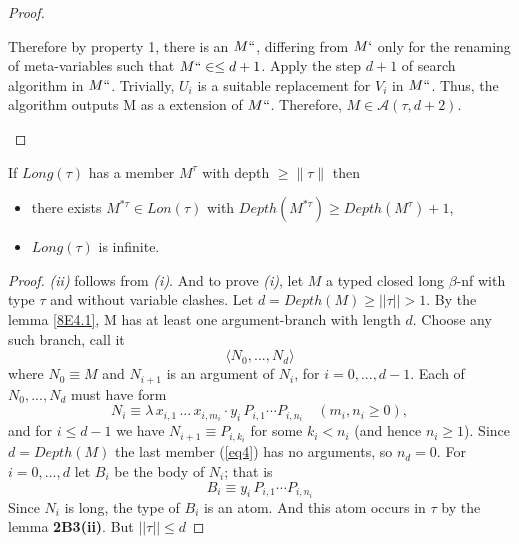 \documentclass[a4paper,10pt]{article}
\begin{document}
\begin{lem}
\begin{proof}
\begin{itemize}
                 Therefore by property 1, there is an $M``$, differing
                 from $M`$ only for the renaming of meta-variables
                 such that $M`` \in \leq d+1$.  Apply the step $d+1$
                 of search algorithm in $M``$. Trivially, $U_i$ is a
                 suitable replacement for $V_i$ in $M``$. Thus, the
                 algorithm outputs M as a extension of
                 $M``$. Therefore, $M \in \mathcal{A}(\tau,d+2)$.
        \end{itemize}
 
\end{proof}
\end{lem}

\begin{lem}\label{8F2} If $Long(\tau)$ has a member $M^{\tau}$ with depth $\geq \rVert\tau\rVert$ then
\begin{itemize}
 \item[(i)] there exists $M^{*\tau} \in Lon(\tau)$ with $Depth(M^{*\tau}) \geq Depth(M^{\tau}) + 1$,
 \item[(ii)] $Long(\tau)$ is infinite.
\end{itemize}
\begin{proof}
 {\em (ii)} follows from {\em (i)}. And to prove {\em (i)}, let $M$ a typed closed long $\beta$-nf with type $\tau$ and without variable clashes.
 Let $d = Depth(M) \geq ||\tau ||  > 1$. By the lemma \ref{8E4.1}, M has at least one argument-branch with length $d$. Choose any such branch, call it 
 \begin{equation}\label{eq4}
  \langle N_0, ..., N_d \rangle
 \end{equation}
where $N_0 \equiv M$ and $N_{i+1}$ is an argument of $N_i$, for $i = 0, ..., d - 1$. Each of $N_0, ..., N_d$ must have form
\begin{equation}
 N_i \equiv \lambda\,x_{i,1}\,...\,x_{i,m_i}\cdot y_i\,P_{i,1}\cdots P_{i,n_i}\,\,\,\,\,\,(m_i,n_i \geq 0),
\end{equation}
and for $i \leq d - 1$ we have $N_{i+1} \equiv P_{i,k_i}$ for some $k_i < n_i$ (and hence $n_i \geq 1$). Since $d = Depth(M)$
the last member (\ref{eq4}) has no arguments, so $n_d = 0$. For $i = 0, ..., d$ let $B_i$ be the body of $N_i$; that is
\begin{equation}
 B_i \equiv y_i\,P_{i,1}\cdots P_{i,n_i}
\end{equation}
Since $N_i$ is long, the type of $B_i$ is an atom. And this atom occurs in $\tau$ by the lemma \textbf{2B3(ii)}. But $||\tau || \leq d$

\end{proof}
\end{lem}
\end{document}
